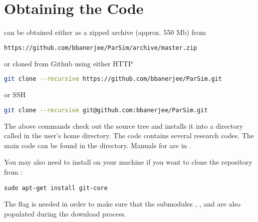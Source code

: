 \documentclass[11pt,fleqn]{book} %
\begin{document}
\section{Obtaining the Code}
\GranularSim can be obtained either as a zipped archive (approx. 550 Mb) from
\begin{lstlisting}[language=sh, backgroundcolor=\color{background}]
https://github.com/bbanerjee/ParSim/archive/master.zip
\end{lstlisting}
or cloned from Github using either HTTP
\begin{lstlisting}[language=sh, backgroundcolor=\color{background}]
git clone --recursive https://github.com/bbanerjee/ParSim.git
\end{lstlisting}
or SSH
\begin{lstlisting}[language=sh, backgroundcolor=\color{background}]
git clone --recursive git@github.com:bbanerjee/ParSim.git
\end{lstlisting}
The above commands check out the \Parsim source tree and
installs it into a directory called  in the user's home
directory.  The \Parsim code contains several research codes.  The
main \GranularSim code can be found in the 
directory.  Manuals for \GranularSim are in .

You may also need to install  on your machine if you 
want to clone the repository from :
\begin{lstlisting}[backgroundcolor=\color{background}]
sudo apt-get install git-core
\end{lstlisting}

\begin{WarningBox}
The  flag is needed in order to make sure that the
submodules , , and  are also populated
during the download process.
\end{WarningBox}
\end{document}
